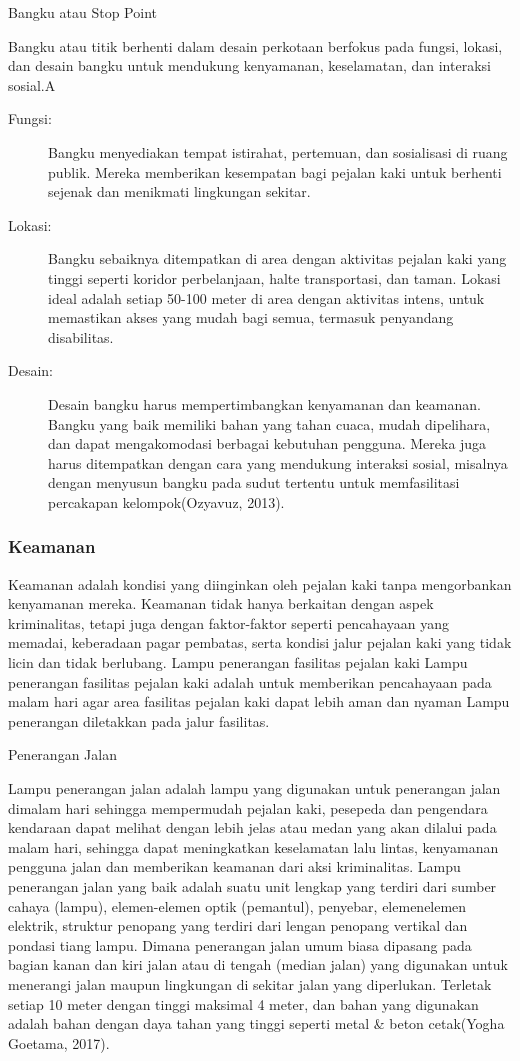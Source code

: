 \documentclass[../rumukota.tex]{subfiles}
\begin{document}
\tabitem Bangku atau Stop Point

Bangku atau titik berhenti dalam desain perkotaan berfokus pada fungsi, lokasi, dan desain bangku untuk mendukung kenyamanan, keselamatan, dan interaksi sosial.A

\begin{description}
	\item[Fungsi:] Bangku menyediakan tempat istirahat, pertemuan, dan sosialisasi di ruang publik. Mereka memberikan kesempatan bagi pejalan kaki untuk berhenti sejenak dan menikmati lingkungan sekitar.
	\item[Lokasi:] Bangku sebaiknya ditempatkan di area dengan aktivitas pejalan kaki yang tinggi seperti koridor perbelanjaan, halte transportasi, dan taman. Lokasi ideal adalah setiap 50-100 meter di area dengan aktivitas intens, untuk memastikan akses yang mudah bagi semua, termasuk penyandang disabilitas.
	\item[Desain:] Desain bangku harus mempertimbangkan kenyamanan dan keamanan. Bangku yang baik memiliki bahan yang tahan cuaca, mudah dipelihara, dan dapat mengakomodasi berbagai kebutuhan pengguna. Mereka juga harus ditempatkan dengan cara yang mendukung interaksi sosial, misalnya dengan menyusun bangku pada sudut tertentu untuk memfasilitasi percakapan kelompok(Ozyavuz, 2013).
\end{description}


\subsubsection{Keamanan}%
\label{ssub:keamanan}
Keamanan adalah kondisi yang diinginkan oleh pejalan kaki tanpa mengorbankan kenyamanan mereka. Keamanan tidak hanya berkaitan dengan aspek kriminalitas, tetapi juga dengan faktor-faktor seperti pencahayaan yang memadai, keberadaan pagar pembatas, serta kondisi jalur pejalan kaki yang tidak licin dan tidak berlubang. Lampu penerangan fasilitas pejalan kaki Lampu penerangan fasilitas pejalan kaki adalah untuk memberikan pencahayaan pada malam hari agar area fasilitas pejalan kaki dapat lebih aman dan nyaman Lampu penerangan diletakkan pada jalur fasilitas.


\tabitem Penerangan Jalan

Lampu penerangan jalan adalah lampu yang digunakan untuk penerangan jalan dimalam hari sehingga mempermudah pejalan kaki, pesepeda dan pengendara kendaraan dapat melihat dengan lebih jelas atau medan yang akan dilalui pada malam hari, sehingga dapat meningkatkan keselamatan lalu lintas, kenyamanan pengguna jalan dan memberikan keamanan dari aksi kriminalitas.
Lampu penerangan jalan yang baik adalah suatu unit lengkap yang terdiri dari sumber cahaya (lampu), elemen-elemen optik (pemantul), penyebar, elemenelemen elektrik, struktur penopang yang terdiri dari lengan penopang vertikal dan pondasi tiang lampu. Dimana penerangan jalan umum biasa dipasang pada bagian kanan dan kiri jalan atau di tengah (median jalan) yang digunakan untuk menerangi jalan maupun lingkungan di sekitar jalan yang diperlukan. Terletak setiap 10 meter dengan tinggi maksimal 4 meter, dan bahan yang digunakan adalah bahan dengan daya tahan yang tinggi seperti metal \& beton cetak(Yogha Goetama, 2017).
\end{document}
